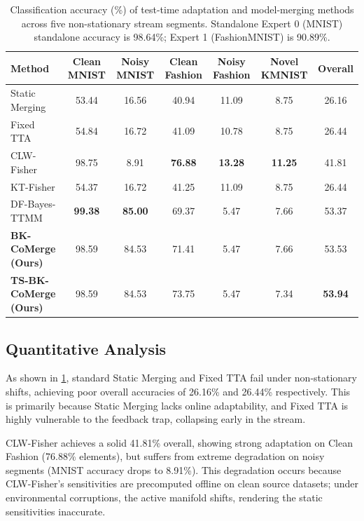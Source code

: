 \documentclass{article}
\theoremstyle{plain}
\theoremstyle{definition}
\theoremstyle{remark}
\begin{document}
\begin{table}[t]
\caption{Classification accuracy (\%) of test-time adaptation and model-merging methods across five non-stationary stream segments. Standalone Expert 0 (MNIST) standalone accuracy is 98.64\%; Expert 1 (FashionMNIST) is 90.89\%.}
\label{tab:results}
\vskip 0.15in
\begin{center}
\begin{small}
\begin{tabular}{lcccccc}
\toprule
Method & Clean MNIST & Noisy MNIST & Clean Fashion & Noisy Fashion & Novel KMNIST & Overall \\
\midrule
Static Merging & 53.44 & 16.56 & 40.94 & 11.09 & 8.75 & 26.16 \\
Fixed TTA & 54.84 & 16.72 & 41.09 & 10.78 & 8.75 & 26.44 \\
CLW-Fisher & 98.75 & 8.91 & \textbf{76.88} & \textbf{13.28} & \textbf{11.25} & 41.81 \\
KT-Fisher & 54.37 & 16.72 & 41.25 & 11.09 & 8.75 & 26.44 \\
DF-Bayes-TTMM & \textbf{99.38} & \textbf{85.00} & 69.37 & 5.47 & 7.66 & 53.37 \\
\midrule
\textbf{BK-CoMerge (Ours)} & 98.59 & 84.53 & 71.41 & 5.47 & 7.66 & 53.53 \\
\textbf{TS-BK-CoMerge (Ours)} & 98.59 & 84.53 & 73.75 & 5.47 & 7.34 & \textbf{53.94} \\
\bottomrule
\end{tabular}
\end{small}
\end{center}
\vskip -0.1in
\end{table}

\subsection{Quantitative Analysis}
As shown in \cref{tab:results}, standard Static Merging and Fixed TTA fail under non-stationary shifts, achieving poor overall accuracies of 26.16\% and 26.44\% respectively. This is primarily because Static Merging lacks online adaptability, and Fixed TTA is highly vulnerable to the feedback trap, collapsing early in the stream.

CLW-Fisher achieves a solid 41.81\% overall, showing strong adaptation on Clean Fashion (76.88\% elements), but suffers from extreme degradation on noisy segments (MNIST accuracy drops to 8.91\%). This degradation occurs because CLW-Fisher's sensitivities are precomputed offline on clean source datasets; under environmental corruptions, the active manifold shifts, rendering the static sensitivities inaccurate.
\end{document}

